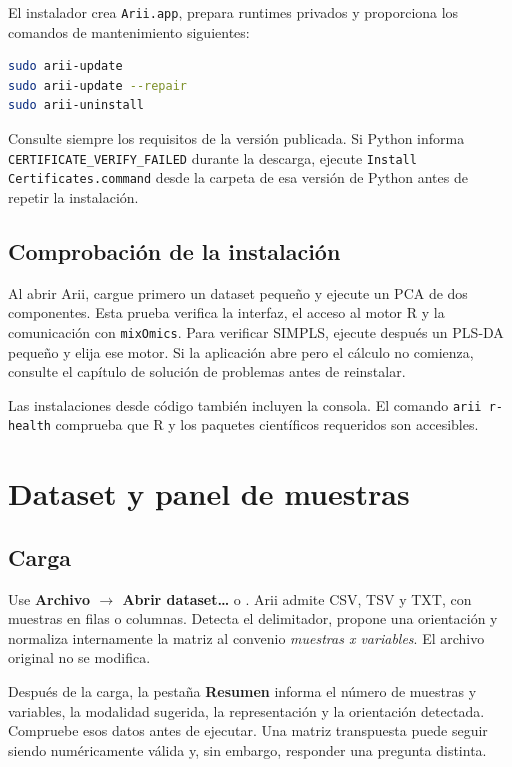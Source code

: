 \documentclass[11pt,a4paper,openany]{report}
\newcommand{\menu}[1]{\textbf{#1}}
\newcommand{\code}[1]{\texttt{#1}}
\newcommand{\tecla}[1]{\fbox{\strut\textsf{#1}}}
\begin{document}
El instalador crea \code{Arii.app}, prepara runtimes privados y proporciona los
comandos de mantenimiento siguientes:

\begin{lstlisting}[language=bash]
sudo arii-update
sudo arii-update --repair
sudo arii-uninstall
\end{lstlisting}

Consulte siempre los requisitos de la versión publicada. Si Python informa
\code{CERTIFICATE\_VERIFY\_FAILED} durante la descarga, ejecute \code{Install Certificates.command} desde la carpeta de esa
versión de Python antes de repetir la instalación.

\section{Comprobación de la instalación}

Al abrir Arii, cargue primero un dataset pequeño y ejecute un PCA de dos
componentes. Esta prueba verifica la interfaz, el acceso al motor R y la
comunicación con \code{mixOmics}. Para verificar SIMPLS, ejecute después un
PLS-DA pequeño y elija ese motor. Si la aplicación abre pero el cálculo no
comienza, consulte el capítulo de solución de problemas antes de reinstalar.

Las instalaciones desde código también incluyen la consola. El comando
\code{arii r-health} comprueba que R y los paquetes científicos requeridos son
accesibles.

\chapter{Dataset y panel de muestras}

\section{Carga}

Use \menu{Archivo \texorpdfstring{$\rightarrow$}{ > } Abrir dataset…} o
\tecla{Ctrl+O}. Arii admite CSV, TSV y TXT,
con muestras en filas o columnas. Detecta el delimitador, propone una
orientación y normaliza internamente la matriz al convenio
\emph{muestras x variables}. El archivo original no se modifica.

Después de la carga, la pestaña \menu{Resumen} informa el número de muestras y
variables, la modalidad sugerida, la representación y la orientación detectada.
Compruebe esos datos antes de ejecutar. Una matriz transpuesta puede seguir
siendo numéricamente válida y, sin embargo, responder una pregunta distinta.
\end{document}
